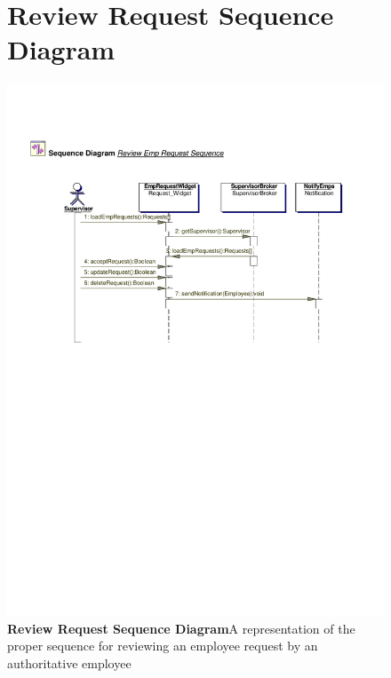 \documentclass[letterpaper,12pt]{report}
\begin{document}
\begin{figure}[hbp]
 \section{Review Request Sequence Diagram}
 \includegraphics[scale=0.65]{externals/SequenceDiagrams10.pdf}
 \caption{\small
\textbf{Review Request Sequence Diagram}\newline A representation of the proper sequence for reviewing an employee request by an authoritative employee}\label{fig:seqMaintEmp}
\end{figure}
\newpage
\end{document}
